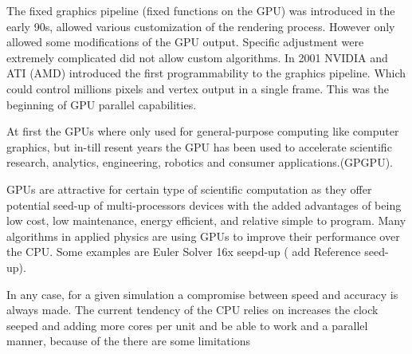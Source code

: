 The fixed graphics pipeline (fixed functions on the GPU) was introduced in the early 90s, allowed various customization of the rendering process. However only allowed some modifications of the GPU output. Specific adjustment were extremely complicated did not allow custom algorithms. In 2001 NVIDIA and ATI (AMD) introduced the first programmability to the graphics pipeline. Which could control millions pixels and vertex output in a single frame. This was the beginning of GPU parallel capabilities.

At first the GPUs where only used for general-purpose computing like computer graphics, but in-till resent years the GPU has been used to accelerate scientific research, analytics, engineering, robotics and consumer applications.(GPGPU)\cite{physicsgpu}.

GPUs are attractive for certain type of scientific computation as they offer potential seed-up of multi-processors devices with the added advantages of being low cost, low maintenance, energy efficient, and relative simple to program. Many algorithms in applied physics are using GPUs to improve their performance over the CPU. Some examples are Euler Solver 16x seepd-up ( add Reference seed-up).

In any case, for a given simulation a compromise between speed and accuracy is always made. The current tendency of the CPU relies on increases the clock seeped and adding more cores per unit and be able to work and a parallel manner, because of the there are some limitations\cite{quantitative}

